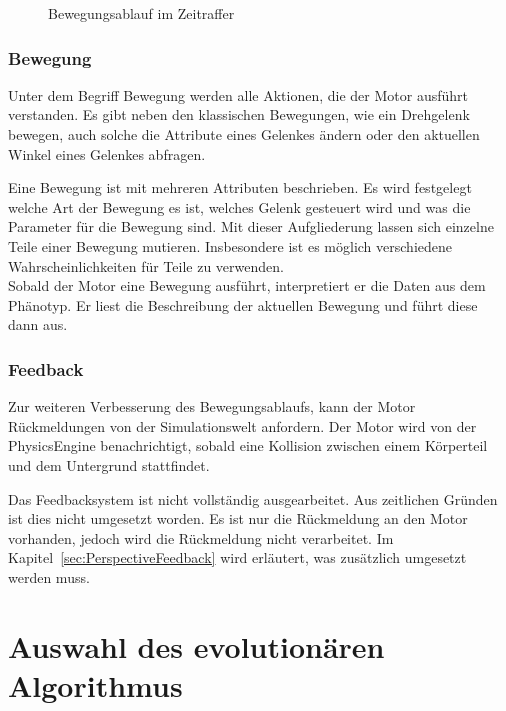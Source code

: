 \begin{figure}[H]
        \caption{Bewegungsablauf im Zeitraffer\label{fig:ConceptMovement}}

      \end{figure}

      \subsubsection{Bewegung\label{subsub:EngineMovement}}

        Unter dem Begriff Bewegung werden alle Aktionen, die der Motor ausführt verstanden.
        Es gibt neben den klassischen Bewegungen, wie ein Drehgelenk bewegen,
        auch solche die Attribute eines Gelenkes ändern oder den aktuellen Winkel eines Gelenkes abfragen.

        \medskip

        Eine Bewegung ist mit mehreren Attributen beschrieben.
        Es wird festgelegt welche Art der Bewegung es ist,
        welches Gelenk gesteuert wird und was die Parameter für die Bewegung sind.
        Mit dieser Aufgliederung lassen sich einzelne Teile einer Bewegung mutieren.
        Insbesondere ist es möglich verschiedene Wahrscheinlichkeiten für Teile zu verwenden.
        \\
        Sobald der Motor eine Bewegung ausführt, interpretiert er die Daten aus dem Phänotyp.
        Er liest die Beschreibung der aktuellen Bewegung und führt diese dann aus.

      \subsubsection{Feedback}

        Zur weiteren Verbesserung des Bewegungsablaufs,
        kann der Motor Rückmeldungen von der Simulationswelt anfordern.
        Der Motor wird von der \gls{PhysicsEngine} benachrichtigt,
        sobald eine Kollision zwischen einem Körperteil und dem Untergrund stattfindet.

        \medskip

        Das Feedbacksystem ist nicht vollständig ausgearbeitet.
        Aus zeitlichen Gründen ist dies nicht umgesetzt worden.
        Es ist nur die Rückmeldung an den Motor vorhanden, jedoch wird die Rückmeldung nicht verarbeitet.
        Im Kapitel~\vref{sec:PerspectiveFeedback} wird erläutert, was zusätzlich umgesetzt werden muss.

  \section{Auswahl des evolutionären Algorithmus}

